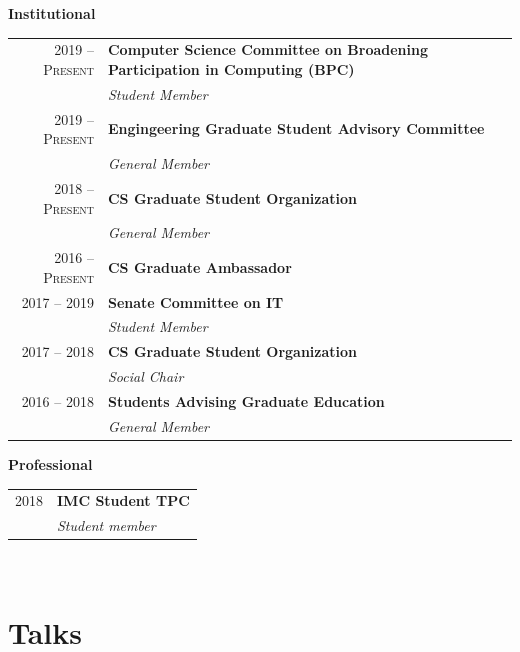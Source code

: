 \documentclass[10pt,singlecolumn]{article} %
\begin{document}
\textbf{Institutional}\\

\begin{tabular}{rl}
2019 -- \textsc{Present} & \textbf{Computer Science Committee on Broadening Participation in Computing (BPC)} \\
& \emph{Student Member} \\

2019 -- \textsc{Present} & \textbf{Engingeering Graduate Student Advisory Committee}\\
& \emph{General Member} \\

2018 -- \textsc{Present} & \textbf{CS Graduate Student Organization}\\
& \emph{General Member} \\

2016 -- \textsc{Present} & \textbf{CS Graduate Ambassador}\\

2017 -- 2019 & \textbf{Senate Committee on IT} \\
& \emph{Student Member} \\

2017 -- 2018 & \textbf{CS Graduate Student Organization}\\
& \emph{Social Chair} \\

2016 -- 2018 & \textbf{Students Advising Graduate Education}\\
& \emph{General Member} \\

\end{tabular} 

\vspace{0.3cm}
\textbf{Professional}\\

\begin{tabular}{rl}
2018 & \textbf{IMC Student TPC} \\
& \emph{Student member}\\
\end{tabular} \\


\section{Talks} 
\end{document}
